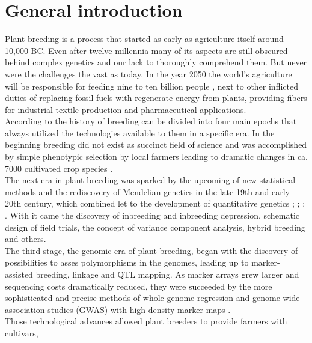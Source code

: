 
\chapter{General introduction} %
\label{Chapter0} %

Plant breeding is a process that started as early as agriculture itself around 10,000
BC. Even after twelve millennia many of its aspects are still obscured behind complex
genetics and our lack to thoroughly comprehend them. But never were the challenges the
vast as today. In the year 2050 the world's agriculture will be responsible for feeding
nine to ten billion people \cite{gerland2014world}, next to other inflicted duties of
replacing fossil fuels with regenerate energy from plants, providing fibers for industrial
textile production and pharmaceutical applications. \\
According to \cite{wallace2018road} the history of breeding can be divided into four main
epochs that always utilized the technologies available to them in a specific era. In the
beginning breeding did not exist as succinct field of science and was accomplished by
simple phenotypic selection by local farmers leading to dramatic changes
in ca. 7000 cultivated crop species \cite{khoury2016origins}.\\
The next era in plant breeding was sparked by the upcoming of new statistical methods and
the rediscovery of Mendelian genetics in the late 19th and early 20th century, which
combined let to the development of quantitative genetics \cite{tschermak1900kunstliche};
\cite{fisher1919xv}; \cite{fisher1923}; \cite{falconer1996}. With it came the discovery of
inbreeding and inbreeding depression, schematic design of field trials, the concept of variance component analysis, hybrid breeding and others. \\
The third stage, the genomic era of plant breeding, began with the discovery of
possibilities to asses polymorphisms in the genomes, leading up to marker-assisted
breeding, linkage and QTL mapping. As marker arrays grew larger and sequencing costs
dramatically reduced, they were succeeded by the more sophisticated and precise methods of
whole genome regression and genome-wide association
studies (GWAS) with high-density marker maps \cite{hayes2001,korte2013advantages}. \\
Those technological advances allowed plant breeders to provide farmers with cultivars,

